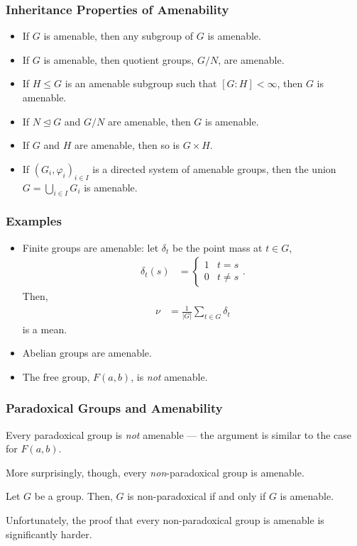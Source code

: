\documentclass{beamer-custom}
\begin{document}
\begin{frame}
  \frametitle{Inheritance Properties of Amenability}
  \begin{itemize}
    \item If $G$ is amenable, then any subgroup of $G$ is amenable.\pause
    \item If $G$ is amenable, then quotient groups, $G/N$, are amenable.\pause
    \item If $H\leq G$ is an amenable subgroup such that $\left[ G:H \right] < \infty$, then $G$ is amenable.\pause
    \item If $N\trianglelefteq G$ and $G/N$ are amenable, then $G$ is amenable.\pause
    \item If $G$ and $H$ are amenable, then so is $G\times H$.\pause
    \item If $\left( G_i,\varphi_i \right)_{i\in I}$ is a directed system of amenable groups, then the union $G = \bigcup_{i\in I}G_i$ is amenable.
  \end{itemize}
\end{frame}
\begin{frame}
  \frametitle{Examples}
  \begin{itemize}
    \item Finite groups are amenable: let $\delta_t$ be the point mass at $t\in G$,
      \begin{align*}
        \delta_t(s) &= \begin{cases}
          1 & t = s\\
          0 & t\neq s
        \end{cases}.
      \end{align*}
      Then,
      \begin{align*}
        \nu &= \frac{1}{\left\vert G \right\vert} \sum_{t\in G}\delta_t
      \end{align*}
      is a mean.
    \item Abelian groups are amenable.
    \item The free group, $F(a,b)$, is \textit{not} amenable.
  \end{itemize}
\end{frame}
\begin{frame}
  \frametitle{Paradoxical Groups and Amenability}
  Every paradoxical group is \textit{not} amenable --- the argument is similar to the case for $F(a,b)$.\pause\newline

  More surprisingly, though, every \textit{non}-paradoxical group is amenable.\pause
  \begin{theorem}
    Let $G$ be a group. Then, $G$ is non-paradoxical if and only if $G$ is amenable.
  \end{theorem}\pause
  Unfortunately, the proof that every non-paradoxical group is amenable is significantly harder.
\end{frame}
\end{document}
